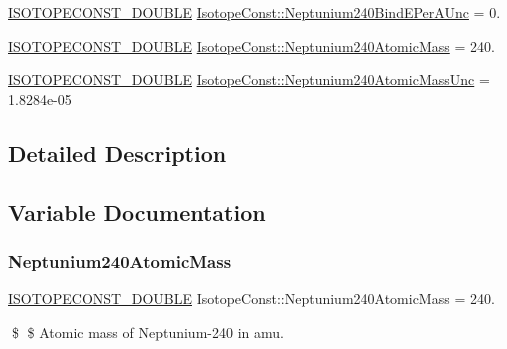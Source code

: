\begin{DoxyCompactItemize}
\mbox{\hyperlink{group___isotope_const-_macros_ga8f45a7272ce02c0b4c65c44636ed719a}{I\+S\+O\+T\+O\+P\+E\+C\+O\+N\+S\+T\+\_\+\+D\+O\+U\+B\+LE}} \mbox{\hyperlink{group___isotope_const-_neptunium-_np240_ga6d70cfb3b4dc919c7159a5d9ccb43141}{Isotope\+Const\+::\+Neptunium240\+Bind\+E\+Per\+A\+Unc}} = 0.
\item 
\mbox{\hyperlink{group___isotope_const-_macros_ga8f45a7272ce02c0b4c65c44636ed719a}{I\+S\+O\+T\+O\+P\+E\+C\+O\+N\+S\+T\+\_\+\+D\+O\+U\+B\+LE}} \mbox{\hyperlink{group___isotope_const-_neptunium-_np240_ga21cbefa5e0dbe051d3a4a835705705f8}{Isotope\+Const\+::\+Neptunium240\+Atomic\+Mass}} = 240.
\item 
\mbox{\hyperlink{group___isotope_const-_macros_ga8f45a7272ce02c0b4c65c44636ed719a}{I\+S\+O\+T\+O\+P\+E\+C\+O\+N\+S\+T\+\_\+\+D\+O\+U\+B\+LE}} \mbox{\hyperlink{group___isotope_const-_neptunium-_np240_ga22d55adbee2b300c8c7d76b9f47ed464}{Isotope\+Const\+::\+Neptunium240\+Atomic\+Mass\+Unc}} = 1.\+8284e-\/05
\end{DoxyCompactItemize}


\subsection{Detailed Description}


\subsection{Variable Documentation}
\mbox{\label{group___isotope_const-_neptunium-_np240_ga21cbefa5e0dbe051d3a4a835705705f8}} 
\subsubsection{\texorpdfstring{Neptunium240\+Atomic\+Mass}{Neptunium240AtomicMass}}
{\footnotesize\ttfamily \mbox{\hyperlink{group___isotope_const-_macros_ga8f45a7272ce02c0b4c65c44636ed719a}{I\+S\+O\+T\+O\+P\+E\+C\+O\+N\+S\+T\+\_\+\+D\+O\+U\+B\+LE}} Isotope\+Const\+::\+Neptunium240\+Atomic\+Mass = 240.}

\$ \$ Atomic mass of Neptunium-\/240 in amu. \mbox{\label{group___isotope_const-_neptunium-_np240_ga22d55adbee2b300c8c7d76b9f47ed464}} 
